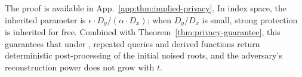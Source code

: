 The proof is available in App.~\ref{app:thm:implied-privacy}. In index space, the inherited parameter is $\epsilon \cdot D_y / (\alpha \cdot D_x)$; when $D_y/D_x$ is small, strong protection is inherited for free. Combined with Theorem~\ref{thm:privacy-guarantee}, this guarantees that under \sysname{}, repeated queries and derived functions return deterministic post-processing of the initial noised roots, and the adversary's reconstruction power does not grow with $t$.
